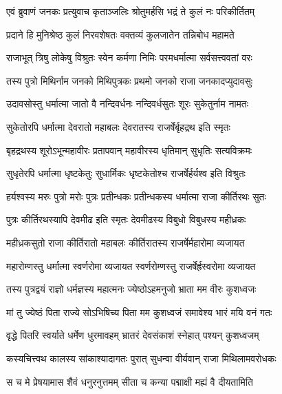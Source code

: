 
\twolineshloka
{एवं ब्रुवाणं जनकः प्रत्युवाच कृताञ्जलिः}
{श्रोतुमर्हसि भद्रं ते कुलं नः परिकीर्तितम्} %

\twolineshloka
{प्रदाने हि मुनिश्रेष्ठ कुलं निरवशेषतः}
{वक्तव्यं कुलजातेन तन्निबोध महामते} %

\twolineshloka
{राजाभूत् त्रिषु लोकेषु विश्रुतः स्वेन कर्मणा}
{निमिः परमधर्मात्मा सर्वसत्त्ववतां वरः} %

\twolineshloka
{तस्य पुत्रो मिथिर्नाम जनको मिथिपुत्रकः}
{प्रथमो जनको राजा जनकादप्युदावसुः} %

\twolineshloka
{उदावसोस्तु धर्मात्मा जातो वै नन्दिवर्धनः}
{नन्दिवर्धसुतः शूरः सुकेतुर्नाम नामतः} %

\twolineshloka
{सुकेतोरपि धर्मात्मा देवरातो महाबलः}
{देवरातस्य राजर्षेर्बृहद्रथ इति स्मृतः} %

\twolineshloka
{बृहद्रथस्य शूरोऽभून्महावीरः प्रतापवान्}
{महावीरस्य धृतिमान् सुधृतिः सत्यविक्रमः} %

\twolineshloka
{सुधृतेरपि धर्मात्मा धृष्टकेतुः सुधार्मिकः}
{धृष्टकेतोश्च राजर्षेर्हर्यश्व इति विश्रुतः} %

\twolineshloka
{हर्यश्वस्य मरुः पुत्रो मरोः पुत्रः प्रतीन्धकः}
{प्रतीन्धकस्य धर्मात्मा राजा कीर्तिरथः सुतः} %

\twolineshloka
{पुत्रः कीर्तिरथस्यापि देवमीढ इति स्मृतः}
{देवमीढस्य विबुधो विबुधस्य महीध्रकः} %

\twolineshloka
{महीध्रकसुतो राजा कीर्तिरातो महाबलः}
{कीर्तिरातस्य राजर्षेर्महारोमा व्यजायत} %

\twolineshloka
{महारोम्णस्तु धर्मात्मा स्वर्णरोमा व्यजायत}
{स्वर्णरोम्णस्तु राजर्षेर्ह्रस्वरोमा व्यजायत} %

\twolineshloka
{तस्य पुत्रद्वयं राज्ञो धर्मज्ञस्य महात्मनः}
{ज्येष्ठोऽहमनुजो भ्राता मम वीरः कुशध्वजः} %

\twolineshloka
{मां तु ज्येष्ठं पिता राज्ये सोऽभिषिच्य पिता मम}
{कुशध्वजं समावेश्य भारं मयि वनं गतः} %

\twolineshloka
{वृद्धे पितरि स्वर्याते धर्मेण धुरमावहम्}
{भ्रातरं देवसंकाशं स्नेहात् पश्यन् कुशध्वजम्} %

\twolineshloka
{कस्यचित्त्वथ कालस्य सांकाश्यादागतः पुरात्}
{सुधन्वा वीर्यवान् राजा मिथिलामवरोधकः} %

\twolineshloka
{स च मे प्रेषयामास शैवं धनुरनुत्तमम्}
{सीता च कन्या पद्माक्षी मह्यं वै दीयतामिति} %


